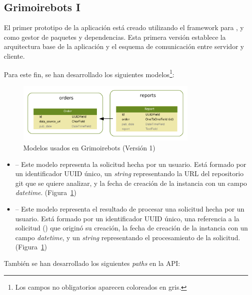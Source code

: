 \subsection{Grimoirebots I}

El primer prototipo de la aplicación está creado utilizando el framework  para , y  como gestor de paquetes y dependencias. Esta primera versión establece la arquitectura base de la aplicación y el esquema de comunicación entre servidor y cliente.

Para este fin, se han desarrollado los siguientes modelos\footnote{Los campos no obligatorios aparecen coloreados en gris.}:

\begin{figure}[ht]
    \centering
    \includegraphics[width=0.8\textwidth]{Figures/grimoirebots_i_models}
    \decoRule
    \caption[Grimoirebots I (modelos)]{Modelos usados en Grimoirebots (Versión 1)}
    \label{fig:grimoirebots_i_models}
\end{figure}

\begin{itemize}
    \item {} -- Este modelo representa la solicitud hecha por un usuario. Está formado por un identificador UUID único, un \emph{string} representando la URL del repositorio git que se quiere analizar, y la fecha de creación de la instancia con un campo \emph{datetime}. (Figura~\ref{fig:grimoirebots_i_models})
    \item {} -- Este modelo representa el resultado de procesar una solicitud hecha por un usuario. Está formado por un identificador UUID único, una referencia a la solicitud () que originó su creación, la fecha de creación de la instancia con un campo \emph{datetime}, y un \emph{string} representando el procesamiento de la solicitud. (Figura~\ref{fig:grimoirebots_i_models})
\end{itemize}

También se han desarrollado los siguientes \emph{paths} en la API:

